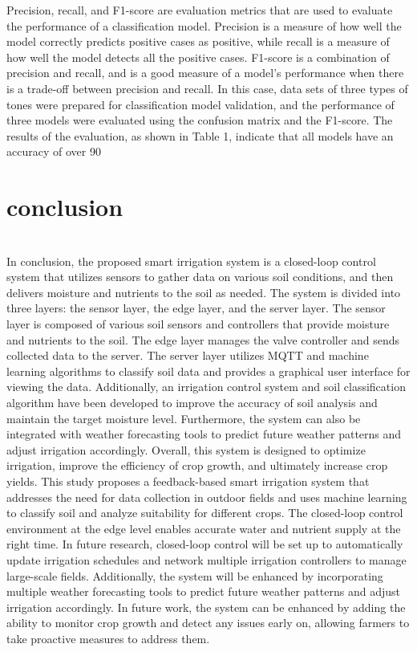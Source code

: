 \documentclass[11pt]{article}
\begin{document}
Precision, recall, and F1-score are evaluation metrics that are used to evaluate the performance of a classification model. Precision is a measure of how well the model correctly predicts positive cases as positive, while recall is a measure of how well the model detects all the positive cases. F1-score is a combination of precision and recall, and is a good measure of a model's performance when there is a trade-off between precision and recall. In this case, data sets of three types of tones were prepared for classification model validation, and the performance of three models were evaluated using the confusion matrix and the F1-score. The results of the evaluation, as shown in Table 1, indicate that all models have an accuracy of over 90%

\section{conclusion}
\indent \\In conclusion, the proposed smart irrigation system is a closed-loop control system that utilizes sensors to gather data on various soil conditions, and then delivers moisture and nutrients to the soil as needed. The system is divided into three layers: the sensor layer, the edge layer, and the server layer. The sensor layer is composed of various soil sensors and controllers that provide moisture and nutrients to the soil. The edge layer manages the valve controller and sends collected data to the server. The server layer utilizes MQTT and machine learning algorithms to classify soil data and provides a graphical user interface for viewing the data. Additionally, an irrigation control system and soil classification algorithm have been developed to improve the accuracy of soil analysis and maintain the target moisture level. Furthermore, the system can also be integrated with weather forecasting tools to predict future weather patterns and adjust irrigation accordingly. Overall, this system is designed to optimize irrigation, improve the efficiency of crop growth, and ultimately increase crop yields. This study proposes a feedback-based smart irrigation system that addresses the need for data collection in outdoor fields and uses machine learning to classify soil and analyze suitability for different crops. The closed-loop control environment at the edge level enables accurate water and nutrient supply at the right time. In future research, closed-loop control will be set up to automatically update irrigation schedules and network multiple irrigation controllers to manage large-scale fields. Additionally, the system will be enhanced by incorporating multiple weather forecasting tools to predict future weather patterns and adjust irrigation accordingly. In future work, the system can be enhanced by adding the ability to monitor crop growth and detect any issues early on, allowing farmers to take proactive measures to address them.



\end{document}
